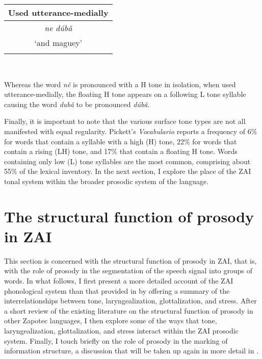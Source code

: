 \begin{table}

\begin{tabular}{ c }
\midrule
Used utterance-medially \\

\midrule
\textit{n{e}}  \textit{d\'{u}b\v{a}} \\
`and maguey' \\

\lspbottomrule
\end{tabular} \\

\end{table}

Whereas the word \textit{n\v{e}} is pronounced with a H tone in isolation, when used utterance-medially, the floating H tone appears on a following L tone syllable causing the word \textit{dub\v{a}} to be pronounced \textit{d\'{u}b\v{a}}.

Finally, it is important to note that the various surface tone types are not all manifested with equal regularity. Pickett's \textit{Vocabulario} \citep{pickett1979} reports a frequency of 6\% for words that contain a syllable with a high (H) tone, 22\% for words that contain a rising (LH) tone, and 17\% that contain a floating H tone. Words containing only low (L) tone syllables are the most common, comprising about 55\% of the lexical inventory. In the next section, I explore the place of the ZAI tonal system within the broader prosodic system of the language.


\section{The structural function of prosody in ZAI}\label{prosody}

This section is concerned with the structural function of prosody in ZAI, that is, with the role of prosody in the segmentation of the speech signal into groups of words. In what follows, I first present a more detailed account of the ZAI phonological system than that provided in  by offering a summary of the interrelationships between tone, laryngealization, glottalization, and stress. After a short review of the existing literature on the structural function of prosody in other Zapotec languages, I then explore some of the ways that tone, laryngealization, glottalization, and stress interact within the ZAI prosodic system. Finally, I touch briefly on the role of prosody in the marking of information structure, a discussion that will be taken up again in more detail in .


